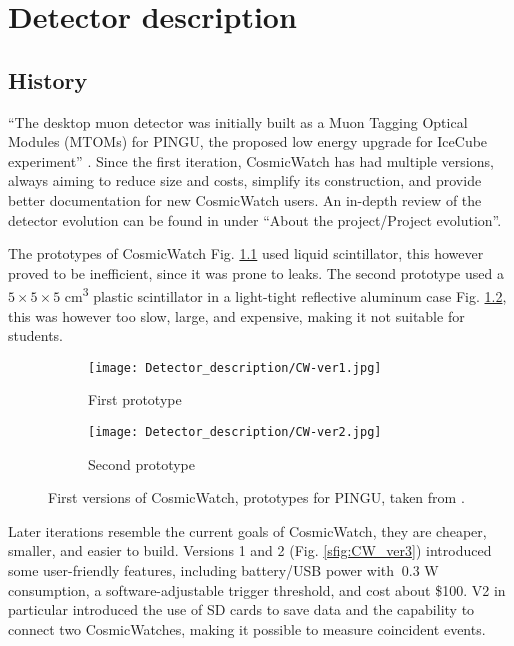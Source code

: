 \chapter{Detector description}

\section{History}

``The desktop muon detector was initially built as a Muon Tagging Optical Modules (MTOMs) for PINGU, the proposed low energy upgrade for IceCube experiment'' \cite{CosmicWatch}. Since the first iteration, CosmicWatch has had multiple versions, always aiming to reduce size and costs, simplify its construction, and provide better documentation for new CosmicWatch users. An in-depth review of the detector evolution can be found in \cite{CosmicWatch} under ``About the project/Project evolution''.

The prototypes of CosmicWatch Fig. \ref{sfig:CW_ver1} used liquid scintillator, this however proved to be inefficient, since it was prone to leaks. The second prototype used a $5\times5\times5$ \unit{\cm\cubed} plastic scintillator in a light-tight reflective aluminum case Fig. \ref{sfig:CW_ver2}, this was however too slow, large, and expensive, making it not suitable for students.

\begin{figure}[H]
  \centering
  \begin{subfigure}[t]{0.45\textwidth}
    \texttt{[image: Detector\_description/CW-ver1.jpg]}
    \caption{\label{sfig:CW_ver1} First prototype}
  \end{subfigure}
  \begin{subfigure}[t]{0.45\textwidth}
    \texttt{[image: Detector\_description/CW-ver2.jpg]}
    \caption{\label{sfig:CW_ver2} Second prototype}
  \end{subfigure}
  \caption{\label{fig:CW_ver1_ver2}First versions of CosmicWatch, prototypes for PINGU, taken from \cite{CosmicWatch}.}
\end{figure}

Later iterations resemble the current goals of CosmicWatch, they are cheaper, smaller, and easier to build. Versions 1 and 2 (Fig. \ref{sfig:CW_ver3}) introduced some user-friendly features, including battery/USB power with $~0.3$ \unit{\watt} consumption, a software-adjustable trigger threshold, and cost about \$100. V2 in particular introduced the use of SD cards to save data and the capability to connect two CosmicWatches, making it possible to measure coincident events.

